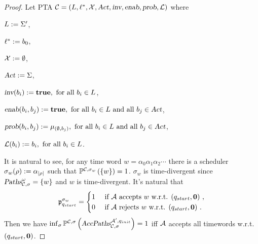 \begin{proof}
Let PTA $\mathcal{C}=\left(L, \ell^*, \mathcal{X}, \mbox{\sl Act}, \mbox{\sl inv}, \mbox{\sl enab},  \mbox{\sl prob}, \mathcal{L}\right)$ where
\begin{compactitem}
    \item $L      :=  \Sigma'$,
    \item $\ell^*     :=  b_{0} $,
    \item $\mathcal{X}    :=  \emptyset $,
    \item $\mbox{\sl Act}      :=  \Sigma $,
    \item $\mbox{\sl inv}(b_{i})              :=  \mathbf{true},
                                            \text{ for all }
                                            b_{i} \in L$,
    \item $\mbox{\sl enab}(b_{i},b_{j})   :=  \mathbf{true},
                                            \text{ for all }
                                            b_{i} \in L
                                            \text{ and all }
                                            b_{j} \in \mbox{\sl Act}$,
    \item $\mbox{\sl prob}(b_{i},b_{j})   :=  \mu_{ \left (
                                                \emptyset,b_{j}
                                            \right)},
                                            \text{ for all }
                                            b_{i} \in L
                                            \text{ and all }
                                            b_{j} \in \mbox{\sl Act}$,
    \item $\mathcal{L}(b_{i})           :=  b_{i},
                                            \text{ for all } b_{i} \in L$.
\end{compactitem}
It is natural to see, for any time word $ w = \alpha_0 \alpha_1 \alpha_2 \cdots $
there is a scheduler $ \sigma_w (\rho ) := \alpha_{\left| \rho \right|} $ such that
$
    \mathbb{P}^{\mathcal{C},\sigma_w }\left(
        \left \{
            w
        \right \}
    \right)
    = 1
$.
$ \sigma_w $ is time-divergent since $\mbox{\sl Paths}^\omega_{\mathcal{C},\sigma} = \{ w \}$ and $w$ is time-divergent.
It's natural that
$$
    \mathfrak{p}_{q_{start}}^{\sigma_w}
        =   \begin{cases}
            1 & \mbox{ if $\mathcal{A}$ accepts $w$ w.r.t. $(q_{start},\mathbf{0})$ },\\
            0 & \mbox{ if $\mathcal{A}$ rejects $w$ w.r.t. $(q_{start},\mathbf{0})$ }.
        \end{cases}
$$
Then we have
$
\inf_\sigma \mathbb{P}^{\mathcal{C},\sigma}\left(
    \mbox{\sl AccPaths} _{\mathcal{C},\sigma} ^{\mathcal{A}',q_{init }}
\right)
    = 1
$
iff
$\mathcal{A}$ accepts all timewords w.r.t. $(q_{start},\mathbf{0})$.
\end{proof}
